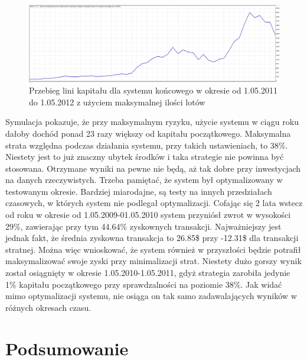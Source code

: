\documentclass[pdflatex,11pt]{aghdpl}
\begin{document}
\begin{figure}[h!]
\begin{center}
\includegraphics[width=16cm]{wszystkie/linia_kap_max.png}
\caption{Przebieg lini kapitału dla systemu końcowego w okresie od 1.05.2011 do 1.05.2012 z użyciem maksymalnej ilości lotów}
\label{linia_kap_max}
\end{center}
\end{figure}
Symulacja pokazuje, że przy maksymalnym ryzyku, użycie systemu w ciągu roku dałoby dochód ponad 23 razy większy od kapitału początkowego. Maksymalna strata względna podczas działania systemu, przy takich ustawieniach, to 38\%. Niestety jest to już znaczny ubytek środków i taka strategie nie powinna być stosowana. Otrzymane wyniki na pewne nie będą, aż tak dobre przy inwestycjach na danych rzeczywistych. Trzeba pamiętać, że system był optymalizowany w testowanym okresie. Bardziej miarodajne, są testy na innych przedziałach czasowych, w których system nie podlegał optymalizacji. Cofając się 2 lata wstecz od roku w okresie od 1.05.2009-01.05.2010 system przyniósł zwrot w wysokości 29\%, zawierając przy tym 44.64\% zyskownych transakcji. Najważniejszy jest jednak fakt, że średnia zyskowna transakcja to 26.85\$ przy -12.31\$ dla transakcji stratnej. Można więc wnioskować, że system również w przyszłości będzie potrafił maksymalizować swoje zyski przy minimalizacji strat. Niestety dużo gorszy wynik został osiągnięty w okresie 1.05.2010-1.05.2011, gdyż strategia zarobiła jedynie 1\% kapitału początkowego przy sprawdzalności na poziomie 38\%. Jak widać mimo optymalizacji systemu, nie osiąga on tak samo zadawalających wyników w różnych okresach czasu.
\chapter{Podsumowanie}
\end{document}
